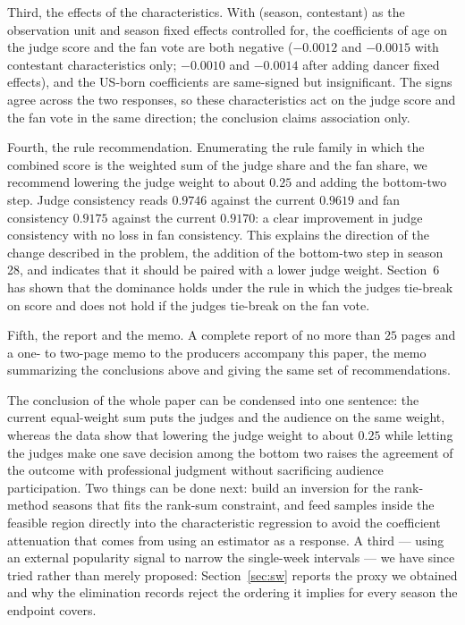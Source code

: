 Third, the effects of the characteristics. With (season, contestant) as the observation unit and season fixed effects controlled for, the coefficients of age on the judge score and the fan vote are both negative ($-0.0012$ and $-0.0015$ with contestant characteristics only; $-0.0010$ and $-0.0014$ after adding dancer fixed effects), and the US-born coefficients are same-signed but insignificant. The signs agree across the two responses, so these characteristics act on the judge score and the fan vote in the same direction; the conclusion claims association only.

Fourth, the rule recommendation. Enumerating the rule family in which the combined score is the weighted sum of the judge share and the fan share, we recommend lowering the judge weight to about $0.25$ and adding the bottom-two step. Judge consistency reads $0.9746$ against the current $0.9619$ and fan consistency $0.9175$ against the current $0.9170$: a clear improvement in judge consistency with no loss in fan consistency. This explains the direction of the change described in the problem, the addition of the bottom-two step in season 28, and indicates that it should be paired with a lower judge weight. Section~6 has shown that the dominance holds under the rule in which the judges tie-break on score and does not hold if the judges tie-break on the fan vote.

Fifth, the report and the memo. A complete report of no more than $25$ pages and a one- to two-page memo to the producers accompany this paper, the memo summarizing the conclusions above and giving the same set of recommendations.

The conclusion of the whole paper can be condensed into one sentence: the current equal-weight sum puts the judges and the audience on the same weight, whereas the data show that lowering the judge weight to about $0.25$ while letting the judges make one save decision among the bottom two raises the agreement of the outcome with professional judgment without sacrificing audience participation. Two things can be done next: build an inversion for the rank-method seasons that fits the rank-sum constraint, and feed samples inside the feasible region directly into the characteristic regression to avoid the coefficient attenuation that comes from using an estimator as a response. A third --- using an external popularity signal to narrow the single-week intervals --- we have since tried rather than merely proposed: Section~\ref{sec:sw} reports the proxy we obtained and why the elimination records reject the ordering it implies for every season the endpoint covers.

